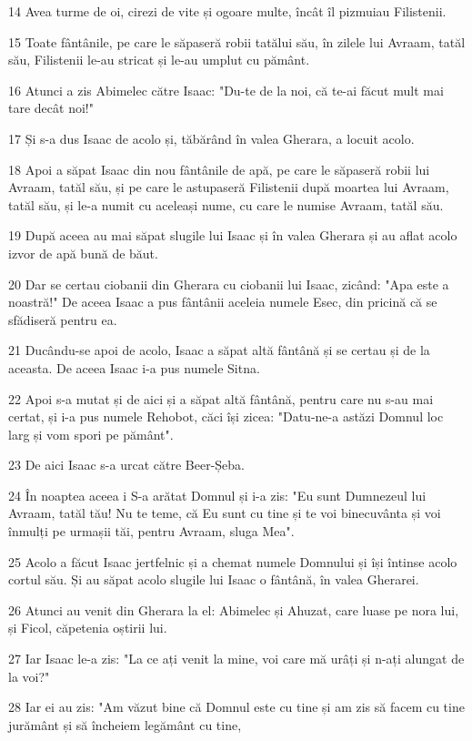 \par 14 Avea turme de oi, cirezi de vite și ogoare multe, încât îl pizmuiau Filistenii.
\par 15 Toate fântânile, pe care le săpaseră robii tatălui său, în zilele lui Avraam, tatăl său, Filistenii le-au stricat și le-au umplut cu pământ.
\par 16 Atunci a zis Abimelec către Isaac: "Du-te de la noi, că te-ai făcut mult mai tare decât noi!"
\par 17 Și s-a dus Isaac de acolo și, tăbărând în valea Gherara, a locuit acolo.
\par 18 Apoi a săpat Isaac din nou fântânile de apă, pe care le săpaseră robii lui Avraam, tatăl său, și pe care le astupaseră Filistenii după moartea lui Avraam, tatăl său, și le-a numit cu aceleași nume, cu care le numise Avraam, tatăl său.
\par 19 După aceea au mai săpat slugile lui Isaac și în valea Gherara și au aflat acolo izvor de apă bună de băut.
\par 20 Dar se certau ciobanii din Gherara cu ciobanii lui Isaac, zicând: "Apa este a noastră!" De aceea Isaac a pus fântânii aceleia numele Esec, din pricină că se sfădiseră pentru ea.
\par 21 Ducându-se apoi de acolo, Isaac a săpat altă fântână și se certau și de la aceasta. De aceea Isaac i-a pus numele Sitna.
\par 22 Apoi s-a mutat și de aici și a săpat altă fântână, pentru care nu s-au mai certat, și i-a pus numele Rehobot, căci își zicea: "Datu-ne-a astăzi Domnul loc larg și vom spori pe pământ".
\par 23 De aici Isaac s-a urcat către Beer-Șeba.
\par 24 În noaptea aceea i S-a arătat Domnul și i-a zis: "Eu sunt Dumnezeul lui Avraam, tatăl tău! Nu te teme, că Eu sunt cu tine și te voi binecuvânta și voi înmulți pe urmașii tăi, pentru Avraam, sluga Mea".
\par 25 Acolo a făcut Isaac jertfelnic și a chemat numele Domnului și își întinse acolo cortul său. Și au săpat acolo slugile lui Isaac o fântână, în valea Gherarei.
\par 26 Atunci au venit din Gherara la el: Abimelec și Ahuzat, care luase pe nora lui, și Ficol, căpetenia oștirii lui.
\par 27 Iar Isaac le-a zis: "La ce ați venit la mine, voi care mă urâți și n-ați alungat de la voi?"
\par 28 Iar ei au zis: "Am văzut bine că Domnul este cu tine și am zis să facem cu tine jurământ și să încheiem legământ cu tine,
